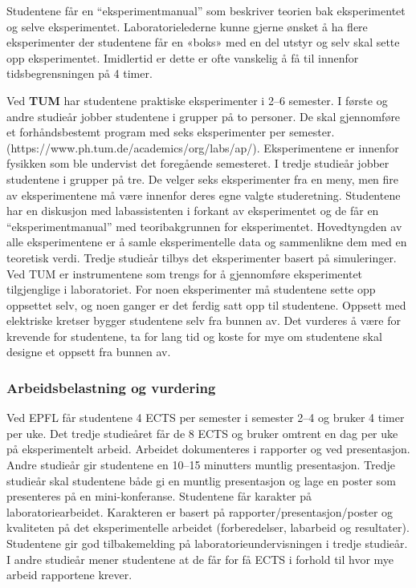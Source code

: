 \documentclass{article}
\begin{document}
Studentene får en ``eksperimentmanual'' som beskriver teorien bak eksperimentet og selve eksperimentet. Laboratorielederne kunne gjerne ønsket å ha flere eksperimenter der studentene får en «boks» med en del utstyr og selv skal sette opp eksperimentet. Imidlertid er dette er ofte vanskelig å få til innenfor tidsbegrensningen på 4 timer.

Ved \textbf{TUM} har studentene praktiske eksperimenter i 2--6 semester. I første og andre studieår jobber studentene i grupper på to personer. De skal gjennomføre et forhåndsbestemt program med seks eksperimenter per semester. (https://www.ph.tum.de/academics/org/labs/ap/). Eksperimentene er innenfor fysikken som ble undervist det foregående semesteret.
I tredje studieår jobber studentene i grupper på tre. De velger seks eksperimenter fra en meny, men fire av eksperimentene må være innenfor deres egne valgte studeretning. Studentene har en diskusjon med labassistenten i forkant av eksperimentet og de får en ``eksperimentmanual'' med teoribakgrunnen for eksperimentet. Hovedtyngden av alle eksperimentene er å samle eksperimentelle data og sammenlikne dem med en teoretisk verdi. Tredje studieår tilbys det eksperimenter basert på simuleringer.
Ved TUM er instrumentene som trengs for å gjennomføre eksperimentet tilgjenglige i laboratoriet. For noen eksperimenter må studentene sette opp oppsettet selv, og noen ganger er det ferdig satt opp til studentene. Oppsett med elektriske kretser bygger studentene selv fra bunnen av. Det vurderes å være for krevende for studentene, ta for lang tid og koste for mye om studentene skal designe et oppsett fra bunnen av.

\subsubsection{Arbeidsbelastning og vurdering}
Ved EPFL får studentene 4 ECTS per semester i semester 2--4 og bruker 4 timer per uke. Det tredje studieåret får de 8 ECTS og bruker omtrent en dag per uke på eksperimentelt arbeid. Arbeidet dokumenteres i rapporter og ved presentasjon. Andre studieår gir studentene en 10--15 minutters muntlig presentasjon. Tredje studieår skal studentene både gi en muntlig presentasjon og lage en poster som presenteres på en mini-konferanse. Studentene får karakter på laboratoriearbeidet. Karakteren er basert på rapporter/presentasjon/poster og kvaliteten på det eksperimentelle arbeidet (forberedelser, labarbeid og resultater).
Studentene gir god tilbakemelding på laboratorieundervisningen i tredje studieår. I andre studieår mener studentene at de får for få ECTS i forhold til hvor mye arbeid rapportene krever.
\end{document}
